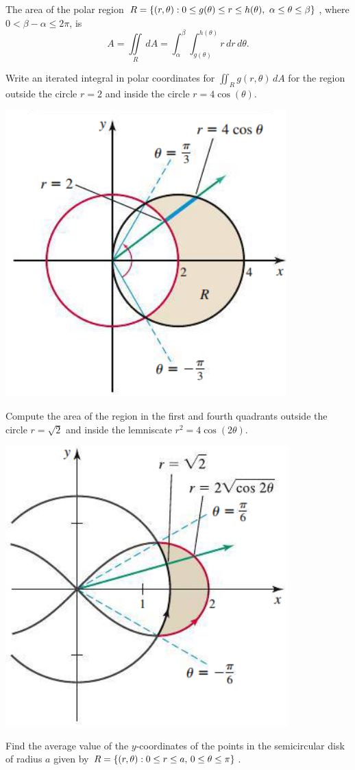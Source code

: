 \documentclass[../mathNotesPreamble]{subfiles}
\begin{document}
  \begin{thmBox*}
    The area of the polar region $R={\left\{(r,\theta): 0\leq g(\theta)\leq r\leq h(\theta),\ \alpha\leq \theta\leq\beta\right\}}$, where $0<\beta-\alpha\leq 2\pi$, is
      \[A=\iint\limits_R\,dA=\int_\alpha^\beta \int_{g(\theta)}^{h(\theta)}r\,dr\,d\theta.\]
  \end{thmBox*}
  \pagebreak

  \begin{ex*}
    Write an iterated integral in polar coordinates for $\iint_R g(r,\theta)\,dA$ for the region outside the circle $r=2$ and inside the circle $r=4\cos(\theta)$.
  \end{ex*}
  \begin{flushright}
    \includegraphics[width=0.35\linewidth]{../images/briggs_16_03/fig16_35}
  \end{flushright}
  \pagebreak

  \begin{ex*}
    Compute the area of the region in the first and fourth quadrants outside the circle $r=\sqrt{2}$ and inside the lemniscate $r^2=4\cos(2\theta)$.
  \end{ex*}
  \begin{flushright}
    \includegraphics[width=0.35\linewidth]{../images/briggs_16_03/fig16_37}
  \end{flushright}
  \pagebreak

  \begin{ex*}
    Find the average value of the $y$-coordinates of the points in the semicircular disk of radius $a$ given by $R={\left\{(r,\theta): 0\leq r\leq a,\, 0\leq\theta\leq\pi\right\}}$.
  \end{ex*}
  \pagebreak
\end{document}
